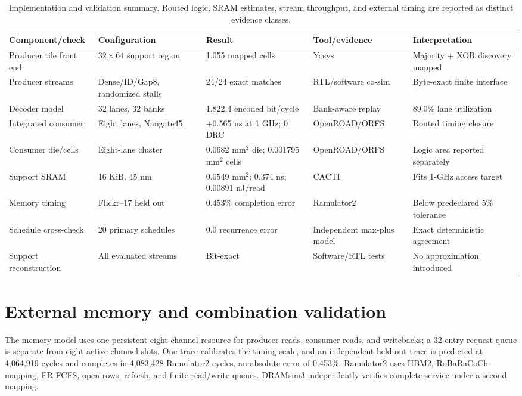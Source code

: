 \documentclass[10pt,conference]{IEEEtran}
\begin{document}
\begin{table}[t]
\centering
\caption{Implementation and validation summary. Routed logic, SRAM estimates, stream throughput, and external timing are reported as distinct evidence classes.}
\label{tab:s-hardware-validation}
\scriptsize
\setlength{\tabcolsep}{4pt}
\begin{tabular}{lllll}
\toprule
Component/check & Configuration & Result & Tool/evidence & Interpretation \\
\midrule
Producer tile front end & $32\times64$ support region & 1,055 mapped cells & Yosys & Majority + XOR discovery mapped \\
Producer streams & Dense/ID/Gap8, randomized stalls & 24/24 exact matches & RTL/software co-sim & Byte-exact finite interface \\
Decoder model & 32 lanes, 32 banks & 1,822.4 encoded bit/cycle & Bank-aware replay & 89.0\% lane utilization \\
Integrated consumer & Eight lanes, Nangate45 & +0.565 ns at 1 GHz; 0 DRC & OpenROAD/ORFS & Routed timing closure \\
Consumer die/cells & Eight-lane cluster & 0.0682 mm$^2$ die; 0.001795 mm$^2$ cells & OpenROAD/ORFS & Logic area reported separately \\
Support SRAM & 16 KiB, 45 nm & 0.0549 mm$^2$; 0.374 ns; 0.00891 nJ/read & CACTI & Fits 1-GHz access target \\
Memory timing & Flickr--17 held out & 0.453\% completion error & Ramulator2 & Below predeclared 5\% tolerance \\
Schedule cross-check & 20 primary schedules & 0.0 recurrence error & Independent max-plus model & Exact deterministic agreement \\
Support reconstruction & All evaluated streams & Bit-exact & Software/RTL tests & No approximation introduced \\
\bottomrule
\end{tabular}
\end{table}

\section{External memory and combination validation}
The memory model uses one persistent eight-channel resource for producer reads, consumer reads, and writebacks; a 32-entry request queue is separate from eight active channel slots. One trace calibrates the timing scale, and an independent held-out trace is predicted at 4,064,919 cycles and completes in 4,083,428 Ramulator2 cycles, an absolute error of 0.453\%. Ramulator2 uses HBM2, RoBaRaCoCh mapping, FR-FCFS, open rows, refresh, and finite read/write queues. DRAMsim3 independently verifies complete service under a second mapping.
\end{document}
